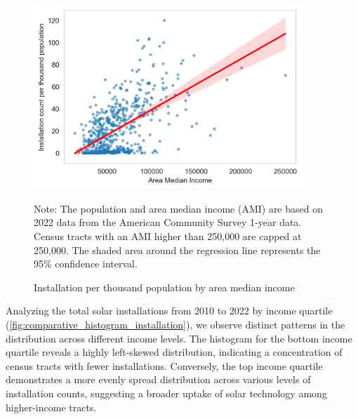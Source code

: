 \documentclass[12pt,twoside,letterpaper]{article}
\begin{document}
\begin{figure}[h]
    \centering
\includegraphics[width=0.9\textwidth]{figures/population_ami_count.png}
    \caption{Installation per thousand population by area median income}
    \label{fig:population_ami_count}
        \begin{flushleft}
        \footnotesize Note: The population and area median income (AMI) are based on 2022 data from the American Community Survey 1-year data. Census tracts with an AMI higher than 250,000 are capped at 250,000. The shaded area around the regression line represents the 95\% confidence interval.
    \end{flushleft}
\end{figure}

Analyzing the total solar installations from 2010 to 2022 by income quartile (\autoref{fig:comparative_histogram_installation}), we observe distinct patterns in the distribution across different income levels. The histogram for the bottom income quartile reveals a highly left-skewed distribution, indicating a concentration of census tracts with fewer installations. Conversely, the top income quartile demonstrates a more evenly spread distribution across various levels of installation counts, suggesting a broader uptake of solar technology among higher-income tracts.
\end{document}
